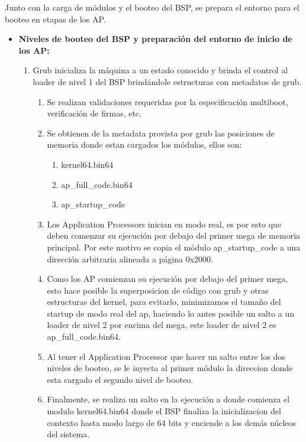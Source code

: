 	Junto con la carga de módulos y el booteo del BSP, se prepara el entorno para el booteo en etapas de los AP.\\
	\begin{itemize}
		\item \textbf{Niveles de booteo del BSP y preparación del entorno de inicio de los AP:} 
			\begin{enumerate}
				\item Grub inicializa la máquina a un estado conocido y brinda el control al loader de nivel 1 del BSP brindándole estructuras con metadatos de grub.
				\begin{enumerate}
					\item Se realizan validaciones requeridas por la especificación multiboot, verificación de firmas, etc.
					
					\item Se obtienen de la metadata provista por grub las posiciones de memoria donde estan cargados los módulos, ellos son:
					\begin{enumerate}
						\item kernel64.bin64
						\item ap\_full\_code.bin64
						\item ap\_startup\_code
					\end{enumerate}
					
					\item Los Application Processors inician en modo real, es por esto que deben comenzar su ejecución por debajo del primer mega de memoria principal. Por este motivo se copia el módulo ap\_startup\_code a una dirección arbitraria alineada a página 0x2000.
					
					\item Como los AP comienzan su ejecución por debajo del primer mega, esto hace posible la superposicion de código con grub y otras estructuras del kernel, para evitarlo, minimizamos el tamaño del startup de modo real del ap, haciendo lo antes posible un salto a un loader de nivel 2 por encima del mega, este loader de nivel 2 es ap\_full\_code.bin64.

					\item Al tener el Application Processor que hacer un salto entre los dos niveles de booteo, se le inyecta al primer módulo la direccion donde esta cargado el segundo nivel de booteo.
					
					\item Finalmente, se realiza un salto en la ejecución a donde comienza el modulo kernel64.bin64 donde el BSP finaliza la inicializacion del contexto hasta modo largo de 64 bits y enciende a los demás núcleos del sistema.
				\end{enumerate}
			\end{enumerate}
	\end{itemize}

